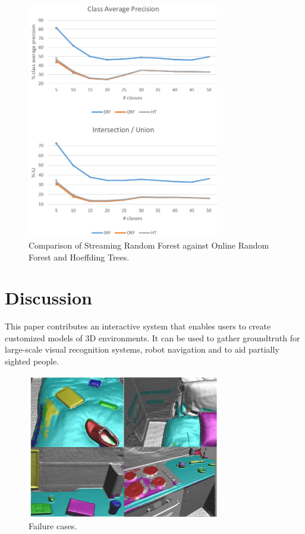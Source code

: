 \documentclass{llncs}
\begin{document}
\begin{figure}[!ht]
 \center
 \includegraphics[width=0.75\textwidth]{figures/srf_results}
 \caption{Comparison of Streaming Random Forest against Online Random Forest and Hoeffding Trees.}
 \label{fig:srf_results}
\end{figure}

\section{Discussion}

  This paper contributes an interactive system that enables users to create customized models of 3D environments. It can be used to gather groundtruth for large-scale visual recognition systems, robot navigation and to aid partially sighted people.
  
\begin{figure}[!ht]	 
 \center
 \includegraphics[width=0.75\textwidth]{figures/failures}
 \caption{Failure cases.}
 \label{fig:failures}
\end{figure}
  
\end{document}
